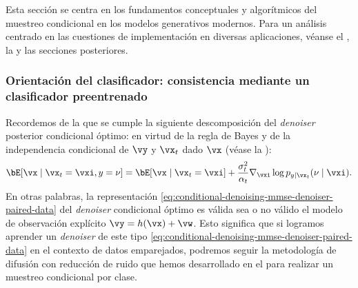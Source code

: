 \documentclass[../../book-main_es.tex]{subfiles}
\begin{document}
Esta sección se centra en los fundamentos conceptuales y algorítmicos del
muestreo condicional en los modelos generativos modernos. Para un análisis centrado en
las cuestiones de implementación en diversas aplicaciones, véanse el ,
la  y las secciones posteriores.

\subsubsection{Orientación del clasificador: consistencia mediante un clasificador preentrenado}

Recordemos de la 
que se cumple la siguiente descomposición del \textit{denoiser} posterior condicional óptimo:
en virtud de la regla de Bayes
y de la independencia condicional de $\vy$ y $\vx_t$ dado $\vx$ (véase la
):
\begin{equation}\label{eq:conditional-denoising-mmse-denoiser-paired-data}
    \bE[ \vx \mid \vx_t=\vxi, y=\nu]
    =
    \bE[\vx \mid \vx_t=\vxi]
    + \frac{\sigma_t^2}{\alpha_t}
    \nabla_{\vxi}\log p_{y \mid \vx_t}(\nu\mid \vxi).
\end{equation}
En otras palabras, la representación
\eqref{eq:conditional-denoising-mmse-denoiser-paired-data}
del \textit{denoiser} condicional óptimo es válida sea o no válido el modelo de observación explícito
$\vy = h(\vx) + \vw$.
Esto significa que si logramos aprender un \textit{denoiser} de este tipo
\eqref{eq:conditional-denoising-mmse-denoiser-paired-data} en el contexto de datos emparejados,
podremos seguir la metodología de difusión con reducción de ruido que hemos desarrollado en el
 para realizar un muestreo condicional por clase.
\end{document}

